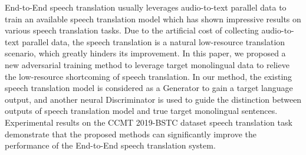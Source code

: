 End-to-End speech translation usually leverages audio-to-text parallel data to train an available speech translation model which has shown impressive results on various speech translation tasks. Due to the artificial cost of collecting audio-to-text parallel data, the speech translation is a natural low-resource translation scenario, which greatly hinders its improvement. In this paper, we proposed a new adversarial training method to leverage target monolingual data to relieve the low-resource shortcoming of speech translation. In our method, the existing speech translation model is considered as a Generator to gain a target language output, and another neural Discriminator is used to guide the distinction between outputs of speech translation model and true target monolingual sentences. Experimental results on the CCMT 2019-BSTC dataset speech translation task demonstrate that the proposed methods can significantly improve the performance of the End-to-End speech translation system.

